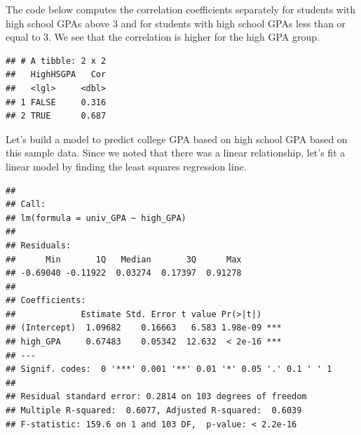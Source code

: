 \documentclass[
]{book}
\newenvironment{Shaded}{\begin{snugshade}}{\end{snugshade}}
\newcommand{\DataTypeTok}[1]{\textcolor[rgb]{0.13,0.29,0.53}{#1}}
\newcommand{\DecValTok}[1]{\textcolor[rgb]{0.00,0.00,0.81}{#1}}
\newcommand{\KeywordTok}[1]{\textcolor[rgb]{0.13,0.29,0.53}{\textbf{#1}}}
\newcommand{\NormalTok}[1]{#1}
\newcommand{\OperatorTok}[1]{\textcolor[rgb]{0.81,0.36,0.00}{\textbf{#1}}}
\newcommand{\StringTok}[1]{\textcolor[rgb]{0.31,0.60,0.02}{#1}}
\begin{document}
The code below computes the correlation coefficients separately for students with high school GPAs above 3 and for students with high school GPAs less than or equal to 3. We see that the correlation is higher for the high GPA group.

\begin{Shaded}
\end{Shaded}

\begin{verbatim}
## # A tibble: 2 x 2
##   HighHSGPA   Cor
##   <lgl>     <dbl>
## 1 FALSE     0.316
## 2 TRUE      0.687
\end{verbatim}

Let's build a model to predict college GPA based on high school GPA based on this sample data. Since we noted that there was a linear relationship, let's fit a linear model by finding the least squares regression line.

\begin{Shaded}
\end{Shaded}

\begin{verbatim}
## 
## Call:
## lm(formula = univ_GPA ~ high_GPA)
## 
## Residuals:
##      Min       1Q   Median       3Q      Max 
## -0.69040 -0.11922  0.03274  0.17397  0.91278 
## 
## Coefficients:
##             Estimate Std. Error t value Pr(>|t|)    
## (Intercept)  1.09682    0.16663   6.583 1.98e-09 ***
## high_GPA     0.67483    0.05342  12.632  < 2e-16 ***
## ---
## Signif. codes:  0 '***' 0.001 '**' 0.01 '*' 0.05 '.' 0.1 ' ' 1
## 
## Residual standard error: 0.2814 on 103 degrees of freedom
## Multiple R-squared:  0.6077,	Adjusted R-squared:  0.6039 
## F-statistic: 159.6 on 1 and 103 DF,  p-value: < 2.2e-16
\end{verbatim}
\end{document}
